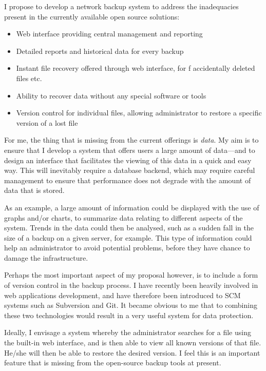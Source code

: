 \documentclass[a4paper]{article}
\begin{document}
    I propose to develop a network backup system to address the inadequacies
    present in the currently available open source solutions:

    \begin{itemize}
        \item Web interface providing central management and reporting
        \item Detailed reports and historical data for every backup
        \item Instant file recovery offered through web interface, for
f           accidentally deleted files etc.
        \item Ability to recover data without any special software or tools
        \item Version control for individual files, allowing administrator to
            restore a specific version of a lost file
    \end{itemize}

    For me, the thing that is missing from the current offerings is
    \emph{data}. My aim is to ensure that I develop a system that offers users
    a large amount of data---and to design an interface that facilitates the
    viewing of this data in a quick and easy way. This will inevitably require
    a database backend, which may require careful management to ensure that
    performance does not degrade with the amount of data that is stored.

    As an example, a large amount of information could be displayed with the
    use of graphs and/or charts, to summarize data relating to different
    aspects of the system. Trends in the data could then be analysed, such as
    a sudden fall in the size of a backup on a given server, for example. This
    type of information could help an administrator to avoid potential
    problems, before they have chance to damage the infrastructure.

    Perhaps the most important aspect of my proposal however, is to include
    a form of version control in the backup process. I have recently been
    heavily involved in web applications development, and have therefore been
    introduced to SCM systems such as Subversion and Git. It became obvious to
    me that to combining these two technologies would result in a very useful
    system for data protection.

    Ideally, I envisage a system whereby the administrator searches for a file
    using the built-in web interface, and is then able to view all known
    versions of that file. He/she will then be able to restore the desired
    version. I feel this is an important feature that is missing from the
    open-source backup tools at present.
    
\end{document}
